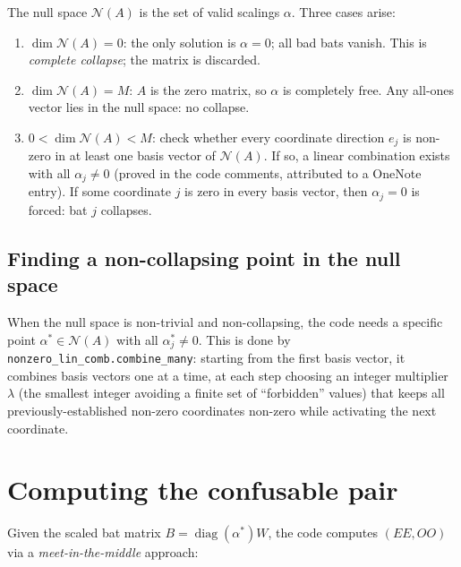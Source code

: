 \documentclass[12pt,a4paper]{article}
\begin{document}
The null space $\mathcal{N}(A)$ is the set of valid scalings $\alpha$. Three
cases arise:
\begin{enumerate}
  \item $\dim \mathcal{N}(A) = 0$: the only solution is $\alpha = 0$; all bad
    bats vanish. This is \emph{complete collapse}; the matrix is discarded.
  \item $\dim \mathcal{N}(A) = M$: $A$ is the zero matrix, so $\alpha$ is
    completely free. Any all-ones vector lies in the null space: no collapse.
  \item $0 < \dim \mathcal{N}(A) < M$: check whether every coordinate
    direction $e_j$ is non-zero in at least one basis vector of
    $\mathcal{N}(A)$. If so, a linear combination exists with all $\alpha_j
    \neq 0$ (proved in the code comments, attributed to a OneNote entry). If
    some coordinate $j$ is zero in every basis vector, then $\alpha_j = 0$ is
    forced: bat $j$ collapses.
\end{enumerate}

\subsection*{Finding a non-collapsing point in the null space}

When the null space is non-trivial and non-collapsing, the code needs a
specific point $\alpha^* \in \mathcal{N}(A)$ with all $\alpha^*_j \neq 0$.
This is done by \texttt{nonzero\_lin\_comb.combine\_many}: starting from the
first basis vector, it combines basis vectors one at a time, at each step
choosing an integer multiplier $\lambda$ (the smallest integer avoiding a
finite set of ``forbidden'' values) that keeps all previously-established
non-zero coordinates non-zero while activating the next coordinate.

\section{Computing the confusable pair}
\label{sec:computing}

Given the scaled bat matrix $B = \operatorname{diag}(\alpha^*) W$, the code
computes $(EE, OO)$ via a \emph{meet-in-the-middle} approach:
\end{document}
